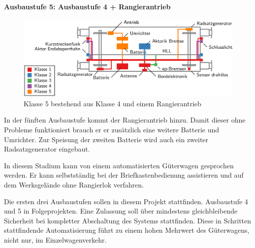 \textbf{Ausbaustufe 5: Ausbaustufe 4 + Rangierantrieb}\par
\begin{figure}[htbp] 
    \includegraphics[width=\textwidth]{Bilder/Ausbaustufen_5.PNG}
    \caption{Klasse 5 bestehend aus Klasse 4 und einem Rangierantrieb}
    \label{fig:Klasse5}
\end{figure} 
In der fünften Ausbaustufe kommt der Rangierantrieb hinzu. Damit dieser ohne Probleme funktioniert brauch er er zusätzlich eine weitere Batterie und Umrichter. Zur Speisung der zweiten Batterie wird auch ein zweiter Radsatzgenerator eingebaut.\par
In diesem Stadium kann von einem automatisierten Güterwagen gesprochen werden. Er kann selbstständig bei der Briefkastenbedienung assistieren und auf dem Werksgelände ohne Rangierlok verfahren.\par
Die ersten drei Ausbaustufen sollen in diesem Projekt stattfinden. Ausbaustufe 4 und 5 in Folgeprojekten. Eine Zulassung soll über mindestens gleichbleibende Sicherheit bei kompletter Abschaltung des Systems stattfinden. Diese in Schritten stattfindende Automatisierung führt zu einem hohen Mehrwert des Güterwagens, nicht nur, im Einzelwagenverkehr.

